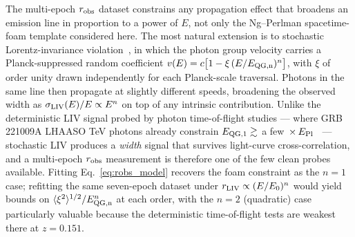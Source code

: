\documentclass[aps,prd,onecolumn,amsmath,amssymb]{revtex4-2}
\begin{document}
The multi-epoch $r_{\rm obs}$ dataset constrains any propagation
effect that broadens an emission line in proportion to a power of
$E$, not only the Ng--Perlman spacetime-foam template considered
here.  The most natural extension is to stochastic Lorentz-invariance
violation~\cite{AmelinoCamelia2013}, in which the photon group
velocity carries a Planck-suppressed random coefficient
$v(E)=c\bigl[1-\xi\,(E/E_{\rm QG,n})^n\bigr]$, with $\xi$ of order
unity drawn independently for each Planck-scale traversal.  Photons
in the same line then propagate at slightly different speeds,
broadening the observed width as
$\sigma_{\rm LIV}(E)/E\propto E^n$ on top of any intrinsic
contribution.  Unlike the deterministic LIV signal probed by photon
time-of-flight studies --- where GRB\,221009A LHAASO TeV photons
already constrain $E_{\rm QG,1}\gtrsim$ a
few~$\times\,E_{\rm Pl}$~\cite{LHAASO2024} --- stochastic LIV
produces a \emph{width} signal that survives light-curve
cross-correlation, and a multi-epoch $r_{\rm obs}$ measurement is
therefore one of the few clean probes available.  Fitting
Eq.~\eqref{eq:robs_model} recovers the foam constraint as the
$n=1$ case; refitting the same seven-epoch dataset under
$r_{\rm LIV}\propto(E/E_0)^n$ would yield bounds on
$\langle\xi^2\rangle^{1/2}/E_{\rm QG,n}^n$ at each order, with the
$n=2$ (quadratic) case particularly valuable because the
deterministic time-of-flight tests are weakest there at $z=0.151$.
\end{document}
